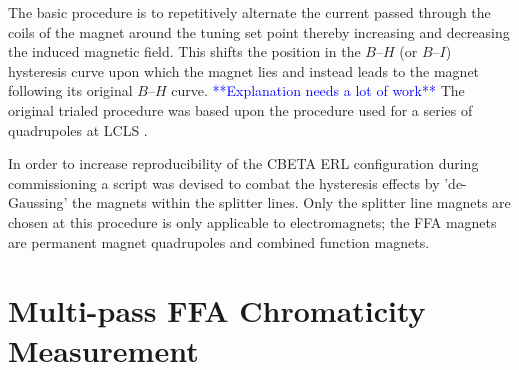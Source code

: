 \documentclass[../main.tex]{subfiles}
\begin{document}
The basic procedure is to repetitively alternate the current passed through the coils of the magnet around the tuning set point thereby increasing and decreasing the induced magnetic field. This shifts the position in the $B$--$H$ (or $B$--$I$) hysteresis curve upon which the magnet lies and instead leads to the magnet following its original $B$--$H$ curve. \textcolor{blue}{**Explanation needs a lot of work**} The original trialed procedure was based upon the procedure used for a series of quadrupoles at LCLS \cite{weidemann2010degaussing}.   

In order to increase reproducibility of the CBETA ERL configuration during commissioning a script was devised to combat the hysteresis effects by 'de-Gaussing' the magnets within the splitter lines. Only the splitter line magnets are chosen at this procedure is only applicable to electromagnets; the FFA magnets are permanent magnet quadrupoles and combined function magnets. 

\section{Multi-pass FFA Chromaticity Measurement}
\end{document}
